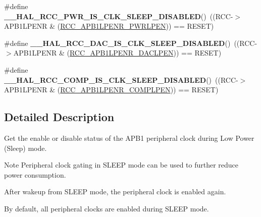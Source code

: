 \begin{DoxyCompactItemize}
\item 
\hypertarget{group___r_c_c___a_p_b1___clock___sleep___enable___disable___status_ga13a44a1aacea32084e5bcdba69e4a636}{\#define {\bfseries \-\_\-\-\_\-\-H\-A\-L\-\_\-\-R\-C\-C\-\_\-\-P\-W\-R\-\_\-\-I\-S\-\_\-\-C\-L\-K\-\_\-\-S\-L\-E\-E\-P\-\_\-\-D\-I\-S\-A\-B\-L\-E\-D}()~((R\-C\-C-\/$>$A\-P\-B1\-L\-P\-E\-N\-R \& (\hyperlink{group___peripheral___registers___bits___definition_ga274fa282ad1ff40b747644bf9360feb4}{R\-C\-C\-\_\-\-A\-P\-B1\-L\-P\-E\-N\-R\-\_\-\-P\-W\-R\-L\-P\-E\-N})) == R\-E\-S\-E\-T)}\label{group___r_c_c___a_p_b1___clock___sleep___enable___disable___status_ga13a44a1aacea32084e5bcdba69e4a636}

\item 
\hypertarget{group___r_c_c___a_p_b1___clock___sleep___enable___disable___status_ga12790e0adb572f2cd2c1b643906aa377}{\#define {\bfseries \-\_\-\-\_\-\-H\-A\-L\-\_\-\-R\-C\-C\-\_\-\-D\-A\-C\-\_\-\-I\-S\-\_\-\-C\-L\-K\-\_\-\-S\-L\-E\-E\-P\-\_\-\-D\-I\-S\-A\-B\-L\-E\-D}()~((R\-C\-C-\/$>$A\-P\-B1\-L\-P\-E\-N\-R \& (\hyperlink{group___peripheral___registers___bits___definition_gaf36a11e89644548702385d548f3f9ec4}{R\-C\-C\-\_\-\-A\-P\-B1\-L\-P\-E\-N\-R\-\_\-\-D\-A\-C\-L\-P\-E\-N})) == R\-E\-S\-E\-T)}\label{group___r_c_c___a_p_b1___clock___sleep___enable___disable___status_ga12790e0adb572f2cd2c1b643906aa377}

\item 
\hypertarget{group___r_c_c___a_p_b1___clock___sleep___enable___disable___status_ga4f8d0195e28b82b74518f1566bc6b9cf}{\#define {\bfseries \-\_\-\-\_\-\-H\-A\-L\-\_\-\-R\-C\-C\-\_\-\-C\-O\-M\-P\-\_\-\-I\-S\-\_\-\-C\-L\-K\-\_\-\-S\-L\-E\-E\-P\-\_\-\-D\-I\-S\-A\-B\-L\-E\-D}()~((R\-C\-C-\/$>$A\-P\-B1\-L\-P\-E\-N\-R \& (\hyperlink{group___peripheral___registers___bits___definition_gae6751f8c4511c642d6086b356f325a63}{R\-C\-C\-\_\-\-A\-P\-B1\-L\-P\-E\-N\-R\-\_\-\-C\-O\-M\-P\-L\-P\-E\-N})) == R\-E\-S\-E\-T)}\label{group___r_c_c___a_p_b1___clock___sleep___enable___disable___status_ga4f8d0195e28b82b74518f1566bc6b9cf}

\end{DoxyCompactItemize}


\subsection{Detailed Description}
Get the enable or disable status of the A\-P\-B1 peripheral clock during Low Power (Sleep) mode. \begin{DoxyNote}{Note}
Peripheral clock gating in S\-L\-E\-E\-P mode can be used to further reduce power consumption. 

After wakeup from S\-L\-E\-E\-P mode, the peripheral clock is enabled again. 

By default, all peripheral clocks are enabled during S\-L\-E\-E\-P mode. 
\end{DoxyNote}
